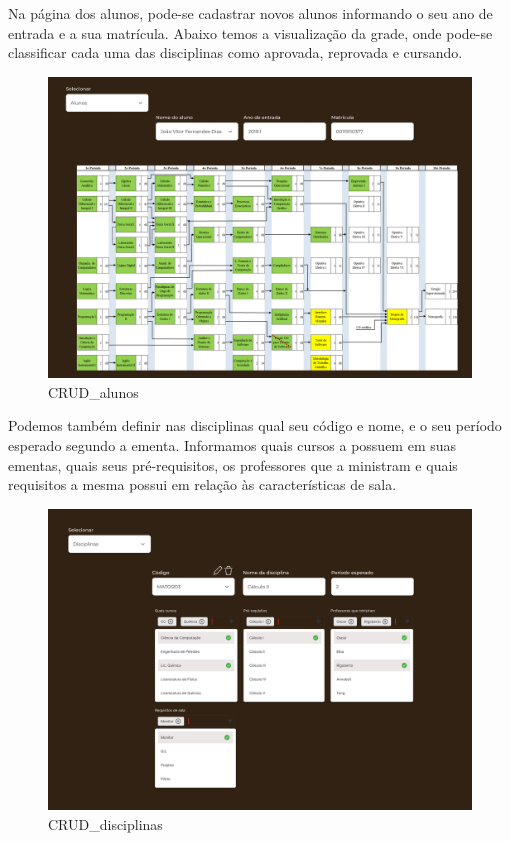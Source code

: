     Na página dos alunos, pode-se cadastrar novos alunos informando o seu ano de entrada e a sua matrícula. Abaixo temos a visualização da grade, onde pode-se classificar cada uma das disciplinas como aprovada, reprovada e cursando.

    \begin{figure}[htbp]\centering
        \caption{\label{fig:CRUD_alunos} CRUD_alunos}
        \includegraphics[scale=0.8]{files/img/Prototipo/CRUD_alunos.png}
    \end{figure} %

    Podemos também definir nas disciplinas qual seu código e nome, e o seu período esperado segundo a ementa. Informamos quais cursos a possuem em suas ementas, quais seus pré-requisitos, os professores que a ministram e quais requisitos a mesma possui em relação às características de sala.

    \begin{figure}[htbp]\centering
        \caption{\label{fig:CRUD_disciplinas} CRUD_disciplinas}
        \includegraphics[scale=0.8]{files/img/Prototipo/CRUD_disciplinas.png}
    \end{figure} %

